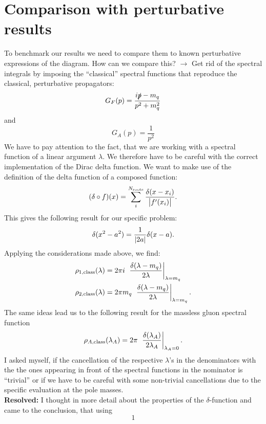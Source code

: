 \documentclass[digital, %
			   openright, %
			   parskip=half,
			   11pt]{mythesis}
\begin{document}
\section*{Comparison with perturbative results }
To benchmark our results we need to compare them to known perturbative expressions of the diagram. How can we compare this? $\rightarrow$ Get rid of the spectral integrals by imposing the \enquote{classical} spectral functions that reproduce the classical, perturbative propagators:
\begin{equation}
	G_F(p) = \frac{i\slashed{p}-m_q}{p^2+m_q^2}
\end{equation}
and 
\begin{equation}
	G_A(p) = \frac{1}{p^2}
\end{equation}
\color{MScRed} We have to pay attention to the fact, that we are working with a spectral function of a linear argument $\lambda$. We therefore have to be careful with the correct implementation of the Dirac delta function. We want to make use of the definition of the delta function of a composed function:
\begin{equation}
	(\delta\circ f)(x) = \sum_i^{N_{\mathrm{roots}}}\frac{\delta(x-x_i)}{\abs{f'(x_i)}}.
\end{equation}
This gives the following result for our specific problem:
\begin{equation}
	\delta(x^2-a^2) = \frac{1}{\abs{2a}}\delta(x-a).
\end{equation}
\normalcolor
Applying the considerations made above, we find:
\begin{equation}
	\begin{aligned}
		\rho_{1,\mathrm{class}}(\lambda) &= 2\pi i\ \eval{\frac{\delta(\lambda-m_q)}{2\lambda}}_{\lambda=m_q}\\
		\rho_{2,\mathrm{class}}(\lambda) &= 2\pi m_q\ \eval{\frac{\delta(\lambda-m_q)}{2\lambda}}_{\lambda=m_q}.
	\end{aligned}
\end{equation}
The same ideas lead us to the following result for the massless gluon spectral function
\begin{equation}
	\rho_{A,\mathrm{class}}(\lambda_A) = 2\pi\ \eval{\frac{\delta(\lambda_A)}{2\lambda_A}}_{\lambda_A=0}.
\end{equation}
\color{MScRed} I asked myself, if the cancellation of the respective $\lambda$'s in the denominators with the the ones appearing in front of the spectral functions in the nominator is \enquote{trivial} or if we have to be careful with some non-trivial cancellations due to the specific evaluation at the pole masses.\\
\textbf{Resolved:} I thought in more detail about the properties of the $\delta$-function and came to the conclusion, that using 
\begin{equation}
	1
\end{equation} 
\normalcolor
\end{document}

